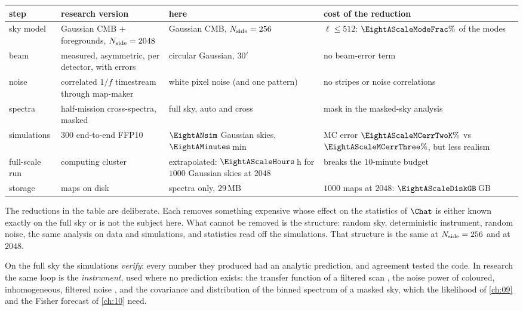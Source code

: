 \begin{taxonomy}
\small
\begin{tabular}{@{}>{\raggedright\arraybackslash}p{2.0cm}>{\raggedright\arraybackslash}p{3.7cm}>{\raggedright\arraybackslash}p{3.2cm}>{\raggedright\arraybackslash}p{3.4cm}@{}}
step & research version & here & cost of the reduction \\
\hline
sky model & Gaussian CMB $+$ foregrounds, $N_{\rm side}=2048$ & Gaussian CMB, $N_{\rm side}=256$ & $\ell\le512$: $\EightAScaleModeFrac\%$ of the modes \\
beam & measured, asymmetric, per detector, with errors & circular Gaussian, $30'$ & no beam-error term \\
noise & correlated $1/f$ timestream through map-maker & white pixel noise (and one pattern) & no stripes or noise correlations \\
spectra & half-mission cross-spectra, masked & full sky, auto and cross & mask in the masked-sky analysis \\
simulations & $300$ end-to-end FFP10 & $\EightANsim$ Gaussian skies, $\EightAMinutes$\,min & MC error $\EightAScaleMCerrTwoK\%$ vs $\EightAScaleMCerrThree\%$, but less realism \\
full-scale run & computing cluster & extrapolated: $\EightAScaleHours$\,h for $1000$ Gaussian skies at $2048$ & breaks the $10$-minute budget \\
storage & maps on disk & spectra only, $29$\,MB & $1000$ maps at $2048$: $\EightAScaleDiskGB$\,GB \\
\end{tabular}
\end{taxonomy}

The reductions in the table are deliberate. Each removes something expensive whose effect
on the statistics of $\Chat$ is either known exactly on the full sky or is not the subject
here. What cannot be removed is the structure: random sky, deterministic instrument,
random noise, the same analysis on data and simulations, and statistics read off the
simulations. That structure is the same at $N_{\rm side}=256$ and at $2048$.

\begin{inpractice}
On the full sky the simulations \emph{verify}: every number they produced had an
analytic prediction, and agreement tested the code. In research the same loop is the
\emph{instrument}, used where no prediction exists: the transfer function of a filtered scan
, the noise power of coloured, inhomogeneous, filtered noise
, and the covariance and distribution of the binned spectrum of a masked sky,
which the likelihood of \cref{ch:09} and the Fisher forecast of \cref{ch:10} need.
\end{inpractice}

